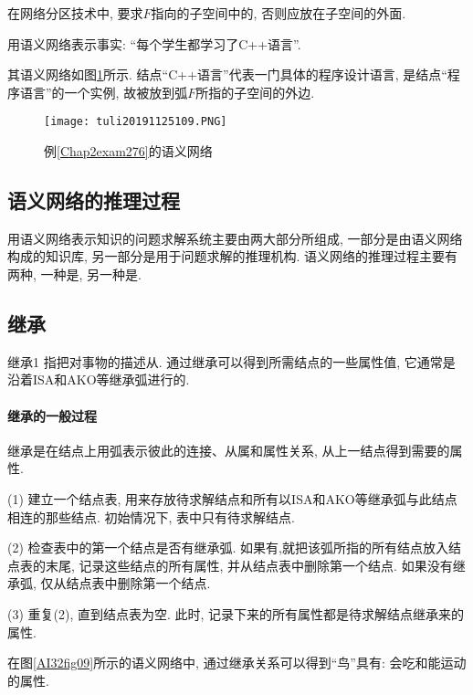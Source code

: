 \begin{remark}
    在网络分区技术中, 要求$F$指向的子空间中的, 否则应放在子空间的外面.
\end{remark}

\begin{example}\label{Chap2exam276}
用语义网络表示事实: “每个学生都学习了C++语言”.
\end{example}
其语义网络如图\ref{AI32fig109}所示. 结点“C++语言”代表一门具体的程序设计语言, 是结点“程序语言”的一个实例, 故被放到弧$F$所指的子空间的外边.
\begin{figure}[H]
\centering
\texttt{[image: tuli20191125109.PNG]}
\caption{例\ref{Chap2exam276}的语义网络}
\label{AI32fig109}
\end{figure}
\subsection{语义网络的推理过程}
用语义网络表示知识的问题求解系统主要由两大部分所组成, 一部分是由语义网络构成的知识库, 另一部分是用于问题求解的推理机构.
语义网络的推理过程主要有两种, 一种是, 另一种是.
\subsection{继承}
\begin{mydef}{继承}{1}
指把对事物的描述从. 通过继承可以得到所需结点的一些属性值, 它通常是沿着ISA和AKO等继承弧进行的.
\end{mydef}
\paragraph{继承的一般过程} 继承是在结点上用弧表示彼此的连接、从属和属性关系,  从上一结点得到需要的属性.

(1) 建立一个结点表, 用来存放待求解结点和所有以ISA和AKO等继承弧与此结点相连的那些结点. 初始情况下, 表中只有待求解结点.

(2) 检查表中的第一个结点是否有继承弧. 如果有,就把该弧所指的所有结点放入结点表的末尾, 记录这些结点的所有属性, 并从结点表中删除第一个结点. 如果没有继承弧, 仅从结点表中删除第一个结点.

(3) 重复(2), 直到结点表为空. 此时, 记录下来的所有属性都是待求解结点继承来的属性.
\begin{example}
    在图\ref{AI32fig09}所示的语义网络中, 通过继承关系可以得到“鸟”具有: 会吃和能运动的属性.
\end{example}
